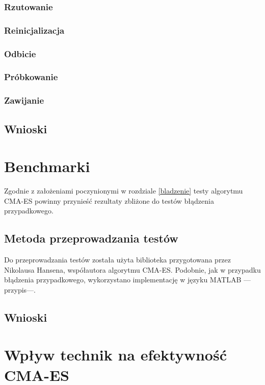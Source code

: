 \documentclass{mini}
\begin{document}
\subsubsection{Rzutowanie}

\subsubsection{Reinicjalizacja}

\subsubsection{Odbicie}

\subsubsection{Próbkowanie}

\subsubsection{Zawijanie}

\subsection{Wnioski}

\pagebreak

\section{Benchmarki}
Zgodnie z założeniami poczynionymi w rozdziale \ref{bladzenie} testy algorytmu CMA-ES powinny przynieść rezultaty zbliżone do testów błądzenia przypadkowego.

\subsection{Metoda przeprowadzania testów}
Do przeprowadzania testów została użyta biblioteka przygotowana przez Nikolausa Hansena, współautora algorytmu CMA-ES. Podobnie, jak w przypadku błądzenia przypadkowego, wykorzystano implementację w języku MATLAB ---przypis---.

\subsection{Wnioski}

\pagebreak

\section{Wpływ technik na efektywność CMA-ES}
\end{document}
